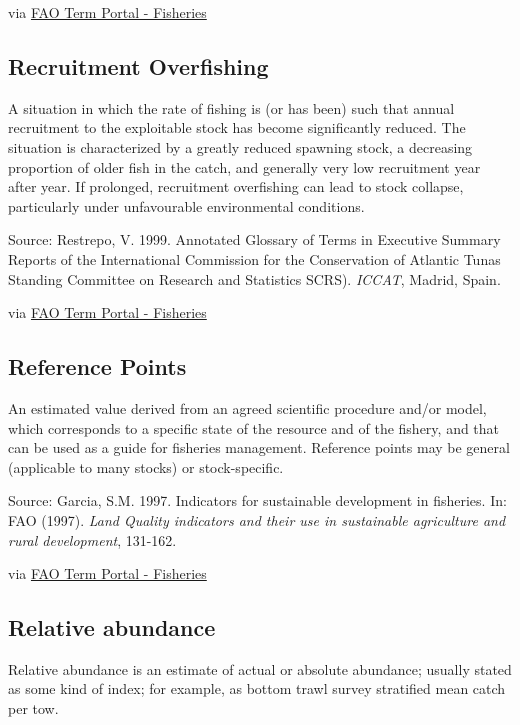 \documentclass[
  11pt,
]{book}
\begin{document}
via \href{http://www.fao.org/fishery/glossary/en}{FAO Term Portal - Fisheries}

\hypertarget{recruitment-overfishing}{%
\subsection{Recruitment Overfishing}\label{recruitment-overfishing}}

A situation in which the rate of fishing is (or has been) such that annual recruitment to the exploitable stock has become significantly reduced. The situation is characterized by a greatly reduced spawning stock, a decreasing proportion of older fish in the catch, and generally very low recruitment year after year. If prolonged, recruitment overfishing can lead to stock collapse, particularly under unfavourable environmental conditions.

Source: Restrepo, V. 1999. Annotated Glossary of Terms in Executive Summary Reports of the International Commission for the Conservation of Atlantic Tunas Standing Committee on Research and Statistics SCRS). \emph{ICCAT}, Madrid, Spain.

via \href{http://www.fao.org/fishery/glossary/en}{FAO Term Portal - Fisheries}

\hypertarget{reference-points}{%
\subsection{Reference Points}\label{reference-points}}

An estimated value derived from an agreed scientific procedure and/or model, which corresponds to a specific state of the resource and of the fishery, and that can be used as a guide for fisheries management. Reference points may be general (applicable to many stocks) or stock-specific.

Source: Garcia, S.M. 1997. Indicators for sustainable development in fisheries. In: FAO (1997). \emph{Land Quality indicators and their use in sustainable agriculture and rural development}, 131-162.

via \href{http://www.fao.org/fishery/glossary/en}{FAO Term Portal - Fisheries}

\hypertarget{relative-abundance}{%
\subsection{Relative abundance}\label{relative-abundance}}

Relative abundance is an estimate of actual or absolute abundance; usually stated as some kind of index; for example, as bottom trawl survey stratiﬁed mean catch per tow.
\end{document}
